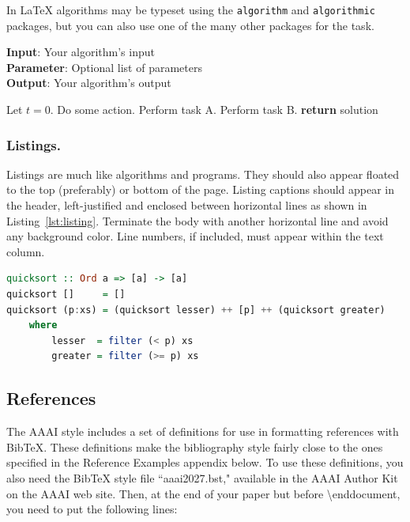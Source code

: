 In \LaTeX{} algorithms may be typeset using the {\tt algorithm} and {\tt algorithmic} packages, but you can also use one of the many other packages for the task.

\begin{algorithm}[tb]
\caption{Example algorithm}
\label{alg:algorithm}
\textbf{Input}: Your algorithm's input\\
\textbf{Parameter}: Optional list of parameters\\
\textbf{Output}: Your algorithm's output
\begin{algorithmic}[1] %
\STATE Let $t=0$.
\STATE Do some action.
\STATE Perform task A.
\ELSE
\STATE Perform task B.
\ENDIF
\ENDWHILE
\STATE \textbf{return} solution
\end{algorithmic}
\end{algorithm}

\subsubsection{Listings.}
Listings are much like algorithms and programs. They should also appear floated to the top (preferably) or bottom of the page. Listing captions should appear in the header, left-justified and enclosed between horizontal lines as shown in Listing~\ref{lst:listing}. Terminate the body with another horizontal line and avoid any background color. Line numbers, if included, must appear within the text column.

\begin{listing}[tb]%
\caption{Example listing {\tt quicksort.hs}}%
\label{lst:listing}%
\begin{lstlisting}[language=Haskell]
quicksort :: Ord a => [a] -> [a]
quicksort []     = []
quicksort (p:xs) = (quicksort lesser) ++ [p] ++ (quicksort greater)
	where
		lesser  = filter (< p) xs
		greater = filter (>= p) xs
\end{lstlisting}
\end{listing}

\subsection{References}
The AAAI style includes a set of definitions for use in formatting references with BibTeX. These definitions make the bibliography style fairly close to the ones  specified in the Reference Examples appendix below. To use these definitions, you also need the BibTeX style file ``aaai2027.bst," available in the AAAI Author Kit on the AAAI web site. Then, at the end of your paper but before \textbackslash end{document}, you need to put the following lines:

